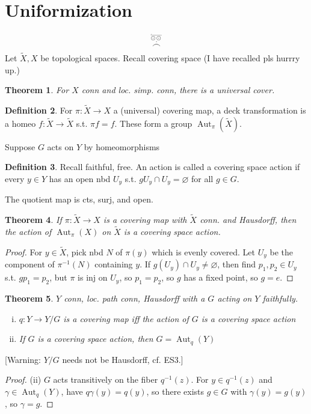 \documentclass{article}
\theoremstyle{definition}
\newtheorem{defn}{Definition}[section]
\theoremstyle{remark}
\theoremstyle{plain}
\newtheorem{thm}[defn]{Theorem}
\begin{document}
\section{Uniformization}
\[\overset{\overset{\leftharpoonup}{\odot\odot}}{\overset{\cdot}{\frown}}\tag{Owen's signature}\]
Let $\tilde X,X$ be topological spaces. Recall covering space (I have recalled pls hurrry up.) 
\begin{thm}
    For $X$ conn and loc. simp. conn, there is a universal cover.
\end{thm}
\begin{defn}
    For $\pi:\tilde X\to X$ a (universal) covering map, a deck transformation is a homeo $f:\tilde X\to \tilde X$ s.t. $\pi f=f$. These form a group $\operatorname{Aut}_\pi(\tilde X)$.
\end{defn}
Suppose $G$ acts on $Y$ by homeomorphisms
\begin{defn}
    Recall faithful, free. An action is called a covering space action if every $y\in Y$ has an open nbd $U_y$ s.t. $gU_y\cap U_y=\varnothing$ for all $g\in G$.
\end{defn}
The quotient map is cts, surj, and open.
\begin{thm}
    If $\pi:\tilde X\to X$ is a covering map with $\tilde X$ conn. and Hausdorff, then the action of $\operatorname{Aut}_\pi(X)$ on $\tilde X$ is a covering space action.
\end{thm}
\begin{proof}
    For $y\in\tilde X$, pick nbd $N$ of $\pi(y)$ which is evenly covered. Let $U_y$ be the component of $\pi^{-1}(N)$ containing $y$. If $g(U_y)\cap U_y\neq\varnothing$, then find $p_1,p_2\in U_y$ s.t. $gp_1=p_2$, but $\pi$ is inj on $U_y$, so $p_1=p_2$, so $g$ has a fixed point, so $g=e$.
\end{proof} 
\begin{thm}
    $Y$ conn, loc. path conn, Hausdorff with a $G$ acting on $Y$ faithfully. 
    \begin{enumerate}[(i)]
        \item $q:Y\to Y/G$ is a covering map iff the action of $G$ is a covering space action
        \item If $G$ is a covering space action, then $G=\operatorname{Aut}_q(Y)$
    \end{enumerate}
\end{thm}
[Warning: $Y/G$ needs not be Hausdorff, cf. ES3.]
\begin{proof}
    (ii) $G$ acts transitively on the fiber $q^{-1}(z)$. For $y\in q^{-1}(z)$ and $\gamma\in\operatorname{Aut}_q(Y)$, have $q\gamma(y)=q(y)$, so there exists $g\in G$ with $\gamma(y)=g(y)$, so $\gamma=g$.
\end{proof}
\end{document}
